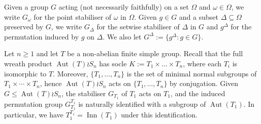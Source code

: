 \documentclass[11pt,a4paper]{amsart}
\theoremstyle{definition}
\DeclareMathOperator{\Inn}{Inn}
\DeclareMathOperator{\Aut}{Aut}
\begin{document}
Given a group $G$ acting (not necessarily faithfully) on a set $\Omega$ and $\omega\in\Omega$, we write $G_\omega$ for the point stabiliser of $\omega$ in $\Omega$. Given $g\in G$ and a subset $\Delta\subseteq\Omega$ preserved by $G$, we write $G_\Delta$ for the setwise stabiliser of $\Delta$ in $G$ and $g^\Delta$ for the permutation induced by $g$ on $\Delta$. We also let $G^\Delta:=\{g^\Delta\colon g\in G\}$.

Let $n\geq 1$ and let $T$ be a non-abelian finite simple group. Recall that the full wreath product $\Aut(T)\wr S_n$ has socle $K := T_1 \times \dots \times T_n$, where each $T_i$ is isomorphic to $T$. Moreover, $\{T_1,\ldots,T_n\}$ is the set of minimal normal subgroups of $T_1\times\cdots\times T_n$, hence $\Aut(T)\wr S_n$ acts on $\{T_1,\ldots,T_n\}$ by conjugation.  Given $G\leq \Aut(T)\wr S_n$, the stabiliser $G_{T_1}$ of $T_1$ acts on $T_1$, and the induced permutation group $G_{T_1}^{T_1}$ is naturally identified with a subgroup of $ \Aut(T_1)$. 
In particular, we have $T_1^{T_1}=\Inn(T_1)$ under this identification.
\end{document}

